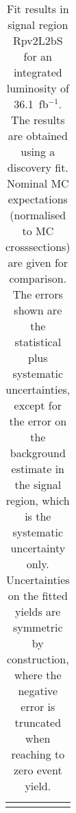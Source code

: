 \begin{table}
\begin{center}
{\begin{tabular*}{\textwidth}{@{\extracolsep{\fill}}lr}
\noalign{\smallskip}\hline\noalign{\smallskip}
\end{tabular*}
}
\end{center}
\caption{Fit results in signal region Rpv2L2bS for an integrated luminosity of 36.1~fb$^{-1}$.
The results are obtained using a discovery fit. Nominal MC expectations (normalised to MC crosssections) are given for comparison.
The errors shown are the statistical plus systematic uncertainties, except for the error on the background estimate in the signal region, which is the systematic uncertainty only.
Uncertainties on the fitted yields are symmetric by construction, where the negative error is truncated when reaching to zero event yield.
}
\label{table.results.systematics.in.logL.fit..Yields.Rpv2L2bS}
\end{table}
\clearpage
%